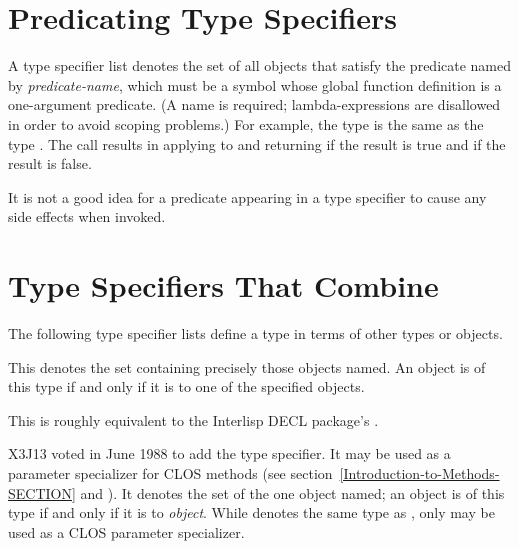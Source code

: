 \section{Predicating Type Specifiers}
\label{PREDICATING-TYPE-SPECIFIERS-SECTION}

A type specifier list  denotes
the set of all objects that satisfy the predicate named by \emph{predicate-name},
which must be a symbol whose global function definition is a one-argument
predicate.
(A name is required; lambda-expressions are disallowed in order to avoid
scoping problems.)  For example, the type  is the
same as the type .
The call  results in applying  to 
and returning  if the result is true and {\nil} if the result is false.

It is not a good idea for
a predicate appearing in a  type specifier to
cause any side effects when invoked.

\section{Type Specifiers That Combine}

The following type specifier lists define a type in terms of
other types or objects.

\begin{flushdesc}
\item[\cd{(member \emph{object1} \emph{object2} ...)}]
This denotes the set
containing precisely those objects named.  An object is of
this type if and only if it is  to one of the specified objects.

\beforenoterule
\begin{incompatibility}
This is roughly equivalent to
the Interlisp DECL package's .
\end{incompatibility}
\afternoterule
\end{flushdesc}

\begin{newer}
\begin{flushdesc}
\item[\cd{(eql \emph{object})}]
X3J13 voted in June 1988  to add the  type specifier.
It may be used as a parameter specializer for CLOS methods
(see section~\ref{Introduction-to-Methods-SECTION}
and ).
It denotes the set of the one object named;  an object is of
this type if and only if it is  to \emph{object}.  While
 denotes the same type as ,
only  may be used as a CLOS parameter specializer.
\end{flushdesc}
\end{newer}


